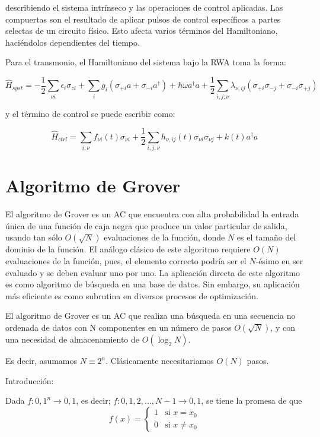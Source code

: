 \documentclass[11pt, spanish]{report}
\begin{document}
describiendo el sistema intrínseco y las operaciones de control aplicadas. Las compuertas son el resultado de aplicar pulsos de control específicos a partes selectas de un circuito físico. Esto afecta varios términos del Hamiltoniano, haciéndolos dependientes del tiempo.

Para el transmonio, el Hamiltoniano del sistema bajo la RWA toma la forma:

\[
\hat{H}_{syst} = -\frac{1}{2} \sum\limits_{\nu i} \epsilon_i \sigma_{z i} + \sum\limits_{i} g_i (\sigma_{+ i} a + \sigma_{- i} a^\dag) + \hbar \omega a^\dag a + \frac{1}{2} \sum\limits_{i,j;\nu} \lambda_{\nu, ij} (\sigma_{+ i} \sigma_{- j} + \sigma_{- i} \sigma_{+ j})
\]

y el término de control se puede escribir como:

\[
\hat{H}_{ctrl} = \sum\limits_{i; \nu} f_{\nu i}(t) \sigma_{\nu i} + \frac{1}{2} \sum\limits_{i,j;\nu} h_{\nu, ij}(t) \sigma_{\nu i} \sigma_{\nu j} + k(t) a^\dag a
\]



\chapter{Algoritmo de Grover}
El algoritmo de Grover es un AC que encuentra con alta probabilidad la entrada única de una función de caja negra que produce un valor particular de salida, usando tan sólo $O(\sqrt{N})$ evaluaciones de la función, donde $N$ es el tamaño del dominio de la función. El análogo clásico de este algoritmo requiere $O(N)$ evaluaciones de la función, pues, el elemento correcto podría ser el $N$-ésimo en ser evaluado y se deben evaluar uno por uno. La aplicación directa de este algoritmo es como algoritmo de búsqueda en una base de datos. Sin embargo, su aplicación más eficiente es como subrutina en diversos procesos de optimización.

El algoritmo de Grover es un AC que realiza una búsqueda en una secuencia no
ordenada de datos con N componentes en un número de pasos $O(\sqrt{N})$, y con
una necesidad de almacenamiento de $O(\log_2 N)$.

Es decir, asumamos $N \equiv 2^n$. Clásicamente necesitariamos $O(N)$ pasos.

Introducción:

Dada $f:{0,1}^n \rightarrow {0,1}$, es decir; $f:{0,1,2,...,N-1} \rightarrow
{0,1}$, se tiene la promesa de que 
\[
  f(x) = 
\begin{cases}
1 & \text{si } x = x_0 \\
0 & \text{si } x \neq x_0
\end{cases}
\]
\end{document}

